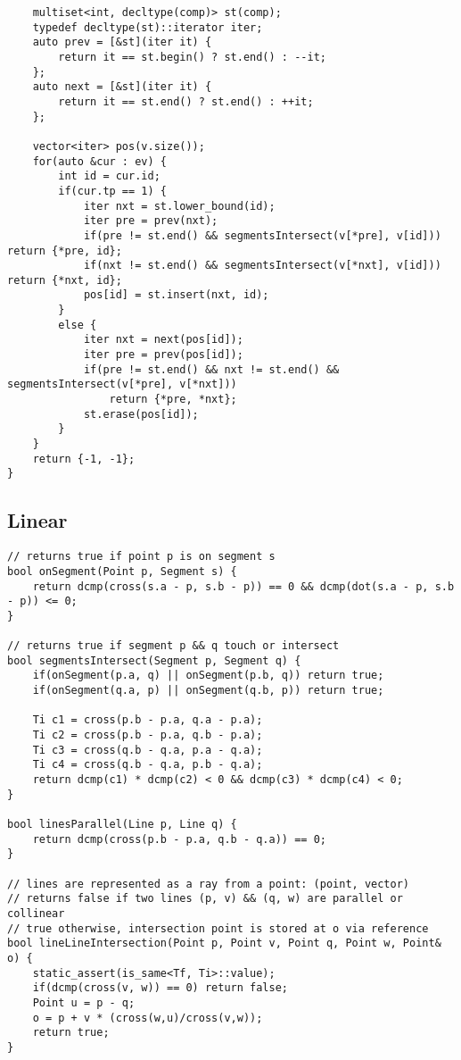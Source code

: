 \documentclass[FSZ,a4paper,onesided]{article}
\begin{document}
\begin{multicols*}{\COLS}
\begin{lstlisting}
    multiset<int, decltype(comp)> st(comp);
    typedef decltype(st)::iterator iter;
    auto prev = [&st](iter it) {
        return it == st.begin() ? st.end() : --it;
    };
    auto next = [&st](iter it) {
        return it == st.end() ? st.end() : ++it;
    };

    vector<iter> pos(v.size());
    for(auto &cur : ev) {
        int id = cur.id;
        if(cur.tp == 1) {
            iter nxt = st.lower_bound(id);
            iter pre = prev(nxt);
            if(pre != st.end() && segmentsIntersect(v[*pre], v[id]))   return {*pre, id};
            if(nxt != st.end() && segmentsIntersect(v[*nxt], v[id]))   return {*nxt, id};
            pos[id] = st.insert(nxt, id);
        }
        else {
            iter nxt = next(pos[id]);
            iter pre = prev(pos[id]);
            if(pre != st.end() && nxt != st.end() && segmentsIntersect(v[*pre], v[*nxt]))
                return {*pre, *nxt};
            st.erase(pos[id]);
        }
    }
    return {-1, -1};
}\end{lstlisting}
\subsection{Linear}
\begin{lstlisting}
// returns true if point p is on segment s
bool onSegment(Point p, Segment s) {
    return dcmp(cross(s.a - p, s.b - p)) == 0 && dcmp(dot(s.a - p, s.b - p)) <= 0;
}

// returns true if segment p && q touch or intersect
bool segmentsIntersect(Segment p, Segment q) {
    if(onSegment(p.a, q) || onSegment(p.b, q)) return true;
    if(onSegment(q.a, p) || onSegment(q.b, p)) return true;

    Ti c1 = cross(p.b - p.a, q.a - p.a);
    Ti c2 = cross(p.b - p.a, q.b - p.a);
    Ti c3 = cross(q.b - q.a, p.a - q.a);
    Ti c4 = cross(q.b - q.a, p.b - q.a);
    return dcmp(c1) * dcmp(c2) < 0 && dcmp(c3) * dcmp(c4) < 0;
}

bool linesParallel(Line p, Line q) {
    return dcmp(cross(p.b - p.a, q.b - q.a)) == 0;
}

// lines are represented as a ray from a point: (point, vector)
// returns false if two lines (p, v) && (q, w) are parallel or collinear
// true otherwise, intersection point is stored at o via reference
bool lineLineIntersection(Point p, Point v, Point q, Point w, Point& o) {
    static_assert(is_same<Tf, Ti>::value);
    if(dcmp(cross(v, w)) == 0) return false;
    Point u = p - q;
    o = p + v * (cross(w,u)/cross(v,w));
    return true;
}


\end{lstlisting}
\end{multicols*}
\end{document}

